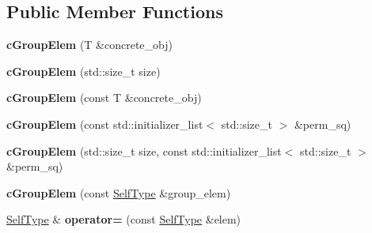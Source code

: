 \subsection*{Public Member Functions}
\begin{DoxyCompactItemize}
\item 
\hypertarget{classcGroupElem_ac677380fd35b7307be8230e01c47d24a}{{\bfseries c\-Group\-Elem} (T \&concrete\-\_\-obj)}\label{classcGroupElem_ac677380fd35b7307be8230e01c47d24a}

\item 
\hypertarget{classcGroupElem_a0e5fb191a65d35d9cc3865aaef02ce42}{{\bfseries c\-Group\-Elem} (std\-::size\-\_\-t size)}\label{classcGroupElem_a0e5fb191a65d35d9cc3865aaef02ce42}

\item 
\hypertarget{classcGroupElem_a7e61b42847fb382a00025af19baf2132}{{\bfseries c\-Group\-Elem} (const T \&concrete\-\_\-obj)}\label{classcGroupElem_a7e61b42847fb382a00025af19baf2132}

\item 
\hypertarget{classcGroupElem_a13a796803737218c08e3d6bb652732d1}{{\bfseries c\-Group\-Elem} (const std\-::initializer\-\_\-list$<$ std\-::size\-\_\-t $>$ \&perm\-\_\-sq)}\label{classcGroupElem_a13a796803737218c08e3d6bb652732d1}

\item 
\hypertarget{classcGroupElem_aaa558bbe798129dccc53712777e1bd4e}{{\bfseries c\-Group\-Elem} (std\-::size\-\_\-t size, const std\-::initializer\-\_\-list$<$ std\-::size\-\_\-t $>$ \&perm\-\_\-sq)}\label{classcGroupElem_aaa558bbe798129dccc53712777e1bd4e}

\item 
\hypertarget{classcGroupElem_af2fe12bf9a1291a5c30905449e2b3a2b}{{\bfseries c\-Group\-Elem} (const \hyperlink{classcGroupElem}{Self\-Type} \&group\-\_\-elem)}\label{classcGroupElem_af2fe12bf9a1291a5c30905449e2b3a2b}

\item 
\hypertarget{classcGroupElem_a75d7cd6508130c2632042fa42041b874}{\hyperlink{classcGroupElem}{Self\-Type} \& {\bfseries operator=} (const \hyperlink{classcGroupElem}{Self\-Type} \&elem)}\label{classcGroupElem_a75d7cd6508130c2632042fa42041b874}


\end{DoxyCompactItemize}
